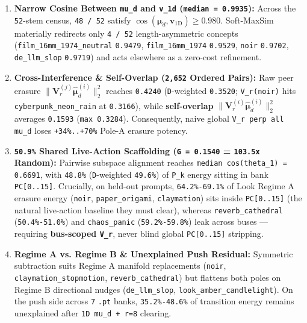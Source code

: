 \documentclass[10pt]{article}
\begin{document}
\begin{enumerate}[leftmargin=*]
\item \textbf{Narrow Cosine Between \texttt{mu\_d} and \texttt{v\_1d} (\texttt{median = 0.9935}):} Across the \texttt{52}-stem census, \texttt{48 / 52} satisfy $\cos(\boldsymbol{\mu}_d, \mathbf{v}_{\text{1D}}) \ge 0.980$. Soft-MaxSim materially redirects only \texttt{4 / 52} length-asymmetric concepts (\texttt{film\_16mm\_1974\_neutral} \texttt{0.9479}, \texttt{film\_16mm\_1974} \texttt{0.9529}, \texttt{noir} \texttt{0.9702}, \texttt{de\_llm\_slop} \texttt{0.9719}) and acts elsewhere as a zero-cost refinement.
\item \textbf{Cross-Interference \& Self-Overlap (\texttt{2,652} Ordered Pairs):} Raw peer erasure $\|\mathbf{V}_r^{(j)} \hat{\boldsymbol{\mu}}_d^{(i)}\|_2^2$ reaches \texttt{0.4240} (\texttt{D}-weighted \texttt{0.3520}; \texttt{V\_r(noir)} hits \texttt{cyberpunk\_neon\_rain} at \texttt{0.3166}), while \textbf{self-overlap} $\|\mathbf{V}_r^{(i)} \hat{\boldsymbol{\mu}}_d^{(i)}\|_2^2$ averages \texttt{0.1593} (\texttt{max 0.3284}). Consequently, naive global \texttt{V\_r perp all mu\_d} loses \texttt{+34\%..+70\%} Pole-A erasure potency.
\item \textbf{\texttt{50.9\%} Shared Live-Action Scaffolding (\texttt{G = 0.1540} = \texttt{103.5x} Random):} Pairwise subspace alignment reaches \texttt{median cos(theta\_1) = 0.6691}, with \texttt{48.8\%} (\texttt{D}-weighted \texttt{49.6\%}) of \texttt{P\_k} energy sitting in bank \texttt{PC[0..15]}. Crucially, on held-out prompts, \texttt{64.2\%-69.1\%} of Look Regime A erasure energy (\texttt{noir}, \texttt{paper\_origami}, \texttt{claymation}) sits inside \texttt{PC[0..15]} (the natural live-action baseline they must clear), whereas \texttt{reverb\_cathedral} (\texttt{50.4\%-51.0\%}) and \texttt{chaos\_panic} (\texttt{59.2\%-59.8\%}) leak across buses --- requiring \textbf{bus-scoped \texttt{V\_r}}, never blind global \texttt{PC[0..15]} stripping.
\item \textbf{Regime A vs. Regime B \& Unexplained Push Residual:} Symmetric subtraction suits Regime A manifold replacements (\texttt{noir}, \texttt{claymation\_stopmotion}, \texttt{reverb\_cathedral}) but flattens both poles on Regime B directional nudges (\texttt{de\_llm\_slop}, \texttt{look\_amber\_candlelight}). On the push side across \texttt{7} \texttt{.pt} banks, \texttt{35.2\%-48.6\%} of transition energy remains unexplained after \texttt{1D mu\_d + r=8} clearing.

\end{enumerate}
\end{document}

